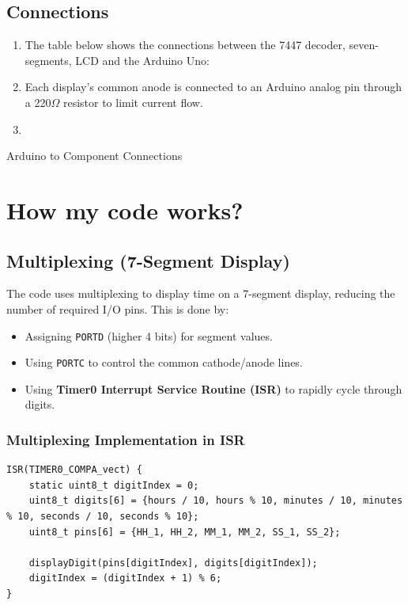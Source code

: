 \documentclass[journal]{IEEEtran}
\numberwithin{equation}{enumi}
\numberwithin{figure}{enumi}
\begin{document}
\subsection{Connections}
\begin{enumerate}
    \item The table below shows the connections between the 7447 decoder, seven-segments, LCD and the Arduino Uno:\\

    \item Each display's common anode is connected to an Arduino analog pin through a 220$\Omega$ resistor to limit current flow.

    \item 
\end{enumerate}
\begin{table}[htbp]
\centering

\caption{Arduino to Component Connections}
\end{table}
\newpage

\section{How my code works?}
\subsection{Multiplexing (7-Segment Display)}

The code uses multiplexing to display time on a 7-segment display, reducing the number of required I/O pins. This is done by:
\begin{itemize}
    \item Assigning \texttt{PORTD} (higher 4 bits) for segment values.
    \item Using \texttt{PORTC} to control the common cathode/anode lines.
    \item Using \textbf{Timer0 Interrupt Service Routine (ISR)} to rapidly cycle through digits.
\end{itemize}


\subsubsection{Multiplexing Implementation in ISR}
\begin{verbatim}
ISR(TIMER0_COMPA_vect) {
    static uint8_t digitIndex = 0;
    uint8_t digits[6] = {hours / 10, hours % 10, minutes / 10, minutes % 10, seconds / 10, seconds % 10};
    uint8_t pins[6] = {HH_1, HH_2, MM_1, MM_2, SS_1, SS_2};

    displayDigit(pins[digitIndex], digits[digitIndex]);
    digitIndex = (digitIndex + 1) % 6;
}
\end{verbatim}
\end{document}
